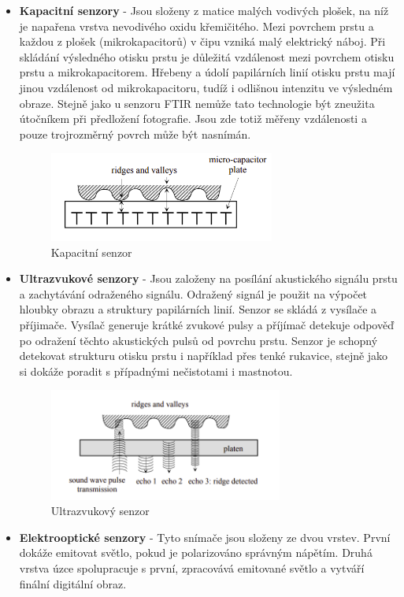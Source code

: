 \begin{itemize}
\item \textbf{Kapacitní senzory} - Jsou složeny z matice malých vodivých plošek, na níž je napařena vrstva nevodivého oxidu křemičitého. \cite{Drahansky} Mezi povrchem prstu a každou z plošek (mikrokapacitorů) v čipu vzniká malý elektrický náboj. Při skládání výsledného otisku prstu je důležitá vzdálenost mezi povrchem otisku prstu a mikrokapacitorem. Hřebeny a údolí papilárních linií otisku prstu mají jinou vzdálenost od mikrokapacitoru, tudíž i odlišnou intenzitu ve výsledném obraze. Stejně jako u senzoru FTIR nemůže tato technologie být zneužita útočníkem při předložení fotografie. Jsou zde totiž měřeny vzdálenosti a pouze trojrozměrný povrch může být nasnímán. \cite{Maltoni2009}

\begin{figure}[!htbp]
    \centering
    \includegraphics[width=280px]{obrazky-figures/kapacit.png}
    \caption{Kapacitní senzor \cite{Maltoni2009}}
\end{figure}
\item \textbf{Ultrazvukové senzory} - Jsou založeny na posílání akustického signálu prstu a zachytávání odraženého signálu. Odražený signál je použit na výpočet hloubky obrazu a struktury papilárních linií. Senzor se skládá z vysílače a příjimače. Vysílač generuje krátké zvukové pulsy a příjímač detekuje odpověď po odražení těchto akustických pulsů od povrchu prstu. Senzor je schopný detekovat strukturu otisku prstu i například přes tenké rukavice, stejně jako si dokáže poradit s případnými nečistotami i mastnotou. \cite{Maltoni2009}

\begin{figure}[!htbp]
    \centering
    \includegraphics[width=290px]{obrazky-figures/ultrasound.png}
    \caption{Ultrazvukový senzor \cite{Maltoni2009}}
\end{figure}
\item \textbf{Elektrooptické senzory} - Tyto snímače jsou složeny ze dvou vrstev. První dokáže emitovat světlo, pokud je polarizováno správným nápětím. Druhá vrstva úzce spolupracuje s první, zpracovává emitované světlo a vytváří finální digitální obraz. \cite{Maltoni2009}


\end{itemize}
